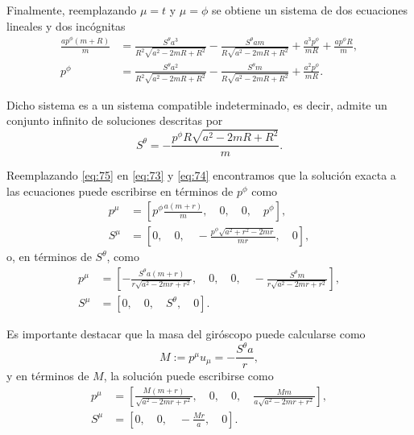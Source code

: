 Finalmente, reemplazando $\mu=t$ y $\mu=\phi$ se obtiene un sistema de dos ecuaciones lineales y dos incógnitas
\begin{align}
\frac{a p^{\phi}(m+R)}{m} &= \frac{S^{\theta} a^{3}}{R^{2} \sqrt{a^{2} - 2 m R + R^{2}}} - \frac{S^{\theta} a m}{R\sqrt{a^{2} - 2 m R + R^{2}}} + \frac{a^{3} p^{\phi}}{m R} + \frac{a p^{\phi} R}{m},\\
p^{\phi} &= \frac{S^{\theta} a^{2}}{R^{2}\sqrt{a^{2} - 2 m R + R^{2}}} - \frac{S^{\theta} m}{R\sqrt{a^{2} - 2 m R + R^{2}}} + \frac{a^{2} p^{\phi}}{m R}.
\end{align}

Dicho sistema es a un sistema compatible indeterminado, es decir, admite un conjunto infinito de soluciones descritas por
\begin{equation}
\label{eq:75}
S^{\theta} = - \frac{p^{\phi}R \sqrt{a^2 - 2mR +R^2}}{m}.
\end{equation}

Reemplazando \eqref{eq:75} en \eqref{eq:73} y \eqref{eq:74} encontramos que la solución exacta a las ecuaciones puede escribirse en términos de $p^{\phi}$ como
\begin{align}
p^{\mu} &= \left[ p^{\phi} \frac{a(m+r)}{m},\quad 0,\quad 0,\quad p^{\phi} \right],\\
S^{\mu} &= \left[0,\quad 0,\quad -\frac{p^{\phi} \sqrt{a^2+r^2-2mr}}{mr},\quad 0\right],
\end{align}
o, en términos de $S^{\theta}$, como
\begin{align}
\label{eq:76}
p^{\mu} &= \left [ - \frac{S^{\theta} a \left(m + r\right)}{r \sqrt{a^{2} - 2 m r + r^{2}} }, \quad 0, \quad 0, \quad - \frac{S^{\theta} m}{r\sqrt{a^{2} - 2 m r + r^{2}}}\right ],\\
\label{eq:77}
S^{\mu} &= \left [ 0, \quad 0, \quad S^{\theta}, \quad 0\right ].
\end{align}

Es importante destacar que la masa del giróscopo puede calcularse como
\begin{equation}
\label{eq:78}
M := p^{\mu} u_{\mu} = -\frac{S^{\theta}a}{r},
\end{equation}
y en términos de $M$, la solución puede escribirse como
\begin{align}
\label{eq:86}
p^{\mu} &= \left [ \frac{M \left(m + r\right)}{\sqrt{a^{2} - 2 m r + r^{2}}}, \quad 0, \quad 0, \quad \frac{M m}{a \sqrt{a^{2} - 2 m r + r^{2}}}\right ],\\
\label{eq:87}
S^{\mu} &= \left [ 0, \quad 0, \quad - \frac{Mr}{a}, \quad 0\right ].
\end{align}

